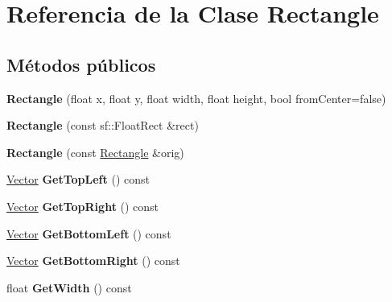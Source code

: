 \hypertarget{classRectangle}{\section{Referencia de la Clase Rectangle}
\label{classRectangle}
}
\subsection*{Métodos públicos}
\begin{DoxyCompactItemize}
\item 
\hypertarget{classRectangle_a35b73b4806da6084d158cfa0614f6cfb}{{\bfseries Rectangle} (float x, float y, float width, float height, bool from\-Center=false)}\label{classRectangle_a35b73b4806da6084d158cfa0614f6cfb}

\item 
\hypertarget{classRectangle_abd680776a248f74ef546739d9fb16790}{{\bfseries Rectangle} (const sf\-::\-Float\-Rect \&rect)}\label{classRectangle_abd680776a248f74ef546739d9fb16790}

\item 
\hypertarget{classRectangle_aae32c2492c1fe3f1cd89842b09996f53}{{\bfseries Rectangle} (const \hyperlink{classRectangle}{Rectangle} \&orig)}\label{classRectangle_aae32c2492c1fe3f1cd89842b09996f53}

\item 
\hypertarget{classRectangle_a0ad4f750573944a4b4358b2c593699b2}{\hyperlink{classVector}{Vector} {\bfseries Get\-Top\-Left} () const }\label{classRectangle_a0ad4f750573944a4b4358b2c593699b2}

\item 
\hypertarget{classRectangle_af5baf2119946b98ab32b06a7663013b4}{\hyperlink{classVector}{Vector} {\bfseries Get\-Top\-Right} () const }\label{classRectangle_af5baf2119946b98ab32b06a7663013b4}

\item 
\hypertarget{classRectangle_a5c825d557b6d723b81ba91df03e4cc89}{\hyperlink{classVector}{Vector} {\bfseries Get\-Bottom\-Left} () const }\label{classRectangle_a5c825d557b6d723b81ba91df03e4cc89}

\item 
\hypertarget{classRectangle_af4c56ef54727b28f0f692c1920231853}{\hyperlink{classVector}{Vector} {\bfseries Get\-Bottom\-Right} () const }\label{classRectangle_af4c56ef54727b28f0f692c1920231853}

\item 
\hypertarget{classRectangle_aac422a67dc5898711fd7aa58aadb647e}{float {\bfseries Get\-Width} () const }\label{classRectangle_aac422a67dc5898711fd7aa58aadb647e}


\end{DoxyCompactItemize}
